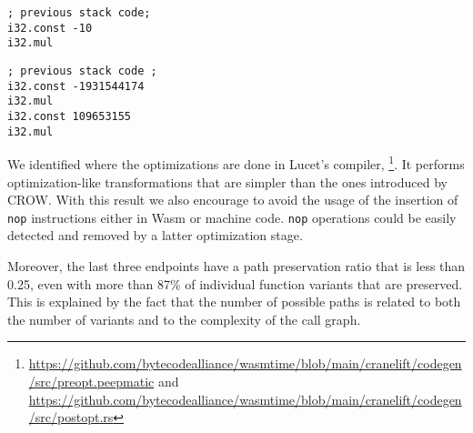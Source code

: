 \lstset{
    language=WAT,
    style=WATStyle,
    stepnumber=0,
    label=EQExample}
\begin{code}
\noindent\begin{minipage}[b]{0.9\linewidth}
    
    \begin{minipage}[t]{0.45\linewidth}
        \begin{lstlisting}
; previous stack code;
i32.const -10
i32.mul
        \end{lstlisting}
    \end{minipage}%
    \hfill\noindent\begin{minipage}[t]{0.45\linewidth}
       
        \begin{lstlisting}
; previous stack code ;
i32.const -1931544174
i32.mul
i32.const 109653155
i32.mul
        \end{lstlisting}
    \end{minipage}
    
    \label{mul:prevalence_example}
\end{minipage}
\end{code}





We identified where the optimizations are done in Lucet's compiler, \footnote{\url{https://github.com/bytecodealliance/wasmtime/blob/main/cranelift/codegen/src/preopt.peepmatic} and \url{https://github.com/bytecodealliance/wasmtime/blob/main/cranelift/codegen/src/postopt.rs}}. It performs optimization-like transformations that are simpler than the ones introduced by CROW. 
With this result we also encourage to avoid the usage of the insertion of \texttt{nop} instructions either in Wasm or machine code. \texttt{nop} operations could be easily detected and removed by a latter optimization stage.



Moreover, the last three endpoints have a path preservation ratio that is less than 0.25, even with more than 87\%  of individual function  variants that are preserved. This is explained by the fact that the number of possible paths is related to both the number of variants and to the complexity of the call graph.

